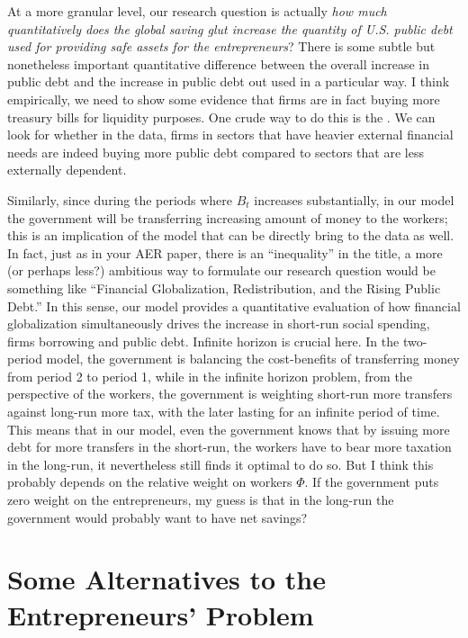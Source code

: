\documentclass[twoside,11pt,leqno]{article}
\begin{document}
At a more granular level, our research question is actually \textit{how much quantitatively does the global saving glut increase the quantity of U.S. public debt used for providing safe assets for the entrepreneurs}? There is some subtle but nonetheless important quantitative difference between the overall increase in public debt and the increase in public debt out used in a particular way. I think empirically, we need to show some evidence that firms are in fact buying more treasury bills for liquidity purposes. One crude way to do this is the \citet{RajanZingales:1998}. We can look for whether in the data, firms in sectors that have heavier external financial needs are indeed buying more public debt compared to sectors that are less externally dependent.

Similarly, since during the periods where $B_{t}$ increases substantially, in our model the government will be transferring increasing amount of money to the workers; this is an implication of the model that can be directly bring to the data as well. In fact, just as in your AER paper, there is an ``inequality'' in the title, a more (or perhaps less?) ambitious way to formulate our research question would be something like ``Financial Globalization, Redistribution, and the Rising Public Debt.'' In this sense, our model provides a quantitative evaluation of how financial globalization simultaneously drives the increase in short-run social spending, firms borrowing and public debt. Infinite horizon is crucial here. In the two-period model, the government is balancing the cost-benefits of transferring money from period 2 to period 1, while in the infinite horizon problem, from the perspective of the workers, the government is weighting short-run more transfers against long-run more tax, with the later lasting for an infinite period of time. This means that in our model, even the government knows that by issuing more debt for more transfers in the short-run, the workers have to bear more taxation in the long-run, it nevertheless still finds it optimal to do so. But I think this probably depends on the relative weight on workers $\Phi$. If the government puts zero weight on the entrepreneurs, my guess is that in the long-run the government would probably want to have net savings?

\section{Some Alternatives to the Entrepreneurs' Problem}
\end{document}
